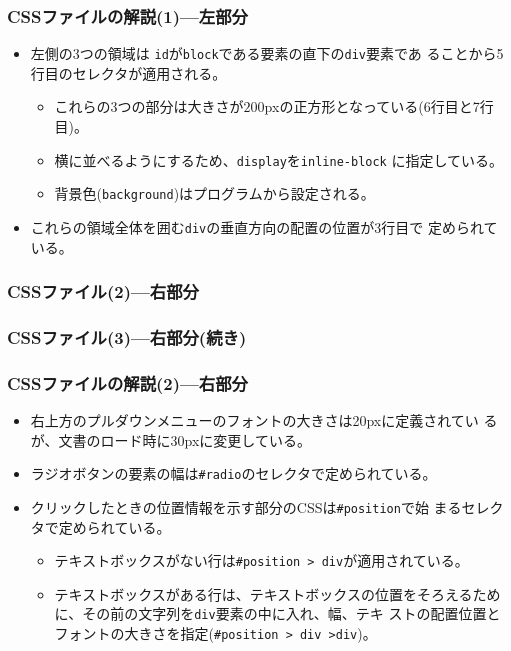 \begin{frame}[containsverbatim]
\frametitle{CSSファイルの解説(1)---左部分}
\begin{itemize}
 \item 左側の3つの領域は
       \texttt{id}が\texttt{block}である要素の直下の\texttt{div}要素であ
       ることから5行目のセレクタが適用される。
\begin{itemize}
 \item これらの3つの部分は大きさが$200$pxの正方形となっている(6行目と7行
       目)。
 \item 横に並べるようにするため、\texttt{display}を\texttt{inline-block}
       に指定している。
 \item 背景色(\texttt{background})はプログラムから設定される。
\end{itemize}
 \item これらの領域全体を囲む\texttt{div}の垂直方向の配置の位置が3行目で
       定められている。
\end{itemize}
\end{frame}
\begin{frame}[containsverbatim]
\frametitle{CSSファイル(2)---右部分}
\end{frame}
\begin{frame}[containsverbatim]
\frametitle{CSSファイル(3)---右部分(続き)}
\end{frame}
\begin{frame}[containsverbatim]
\frametitle{CSSファイルの解説(2)---右部分}
\begin{itemize}
 \item 右上方のプルダウンメニューのフォントの大きさは20pxに定義されてい
       るが、文書のロード時に30pxに変更している。
 \item ラジオボタンの要素の幅は\texttt{\#radio}のセレクタで定められている。

 \item クリックしたときの位置情報を示す部分のCSSは\texttt{\#position}で始
       まるセレクタで定められている。
 \begin{itemize}
  \item テキストボックスがない行は\texttt{\#position > div}が適用されている。
  \item テキストボックスがある行は、テキストボックスの位置をそろえるため
	に、その前の文字列を\texttt{div}要素の中に入れ、幅、テキ
	ストの配置位置とフォントの大きさを指定(\texttt{\#position
	> div >div})。
 \end{itemize}
\end{itemize}
\end{frame}
